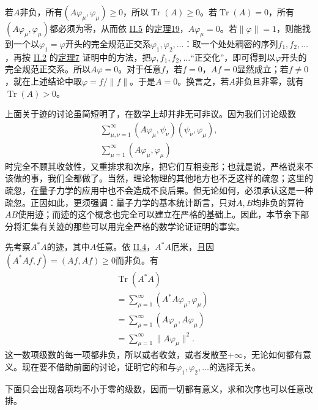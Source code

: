 \documentclass[fontsize=13pt,twoside,openany,headings=normal,parskip=false,bookmarkpackage=false,DIV=calc]{scrbook}
\begin{document}
若$A$非负，所有$(A\varphi_\mu,\allowbreak \varphi_\mu)\geq0$，所以$\operatorname{Tr}(A)\geq0$。若$\operatorname{Tr}(A)=0$，所有$(A\varphi_\mu,\allowbreak \varphi_\mu)$都必须为零，从而依 \hyperref[sec:II.5]{II.5} 的\CJKglue \hyperref[thm:II.19]{定理19}，$A\varphi_\mu=0$。若$\|\varphi\|=1$，则能找到一个以$\varphi_1=\varphi$开头的完全规范正交系$\varphi_1,\allowbreak \varphi_2,\allowbreak \ldots$：取一个处处稠密的序列$f_1,\allowbreak f_2,\allowbreak \ldots$，再按 \hyperref[sec:II.2]{II.2} 的\CJKglue \hyperref[thm:II.7]{定理7} 证明中的方法，把$\varphi,\allowbreak f_1,\allowbreak f_2,\allowbreak \ldots$“正交化”，即可得到以$\varphi$开头的完全规范正交系。所以$A\varphi=0$。对于任意$f$，若$f=0$，$Af=0$显然成立；若$f\ne0$，就在上述结论中取$\varphi=f/\|f\|$。于是$A=0$。换言之，若$A$非负且非零，就有$\operatorname{Tr}(A)>0$。

上面关于迹的讨论虽简短明了，在数学上却并非无可非议。因为我们讨论级数
\begin{gather*}
\sum_{\mu,\nu=1}^\infty(A\varphi_\mu,\psi_\nu)(\psi_\nu,\varphi_\mu)
,\\
\sum_{\mu=1}^\infty(A\varphi_\mu,\varphi_\mu)
\end{gather*}
时完全不顾其收敛性，又重排求和次序，把它们互相变形；也就是说，严格说来不该做的事，我们全都做了。当然，理论物理的其他地方也不乏这样的疏忽；这里的疏忽，在量子力学的应用中也不会造成不良后果。但无论如何，必须承认这是一种疏忽。正因如此，更须强调：量子力学的基本统计断言，只对$A,\allowbreak B$均非负的算符$AB$使用迹；而迹的这个概念也完全可以建立在严格的基础上。因此，本节余下部分将汇集有关迹的那些可以用完全严格的数学论证证明的事实。

先考察$A^*A$的迹，其中$A$任意。依 \hyperref[sec:II.4]{II.4}，$A^*A$厄米，且因$(A^*Af,\allowbreak f)=(Af,\allowbreak Af)\geq0$而非负。有
\begin{align*}
&\operatorname{Tr}(A^*A)\\
&=\sum_{\mu=1}^\infty(A^*A\varphi_\mu,\varphi_\mu)\\
&=\sum_{\mu=1}^\infty(A\varphi_\mu,A\varphi_\mu)\\
&=\sum_{\mu=1}^\infty\|A\varphi_\mu\|^2.
\end{align*}
这一数项级数的每一项都非负，所以或者收敛，或者发散至$+\infty$，无论如何都有意义。现在要不借助前面的讨论，证明它的和与$\varphi_1,\allowbreak \varphi_2,\allowbreak \ldots$的选择无关。


\hypertarget{origpage-96}{}\label{origpage-96}下面只会出现各项均不小于零的级数，因而一切都有意义，求和次序也可以任意改排。
\end{document}
